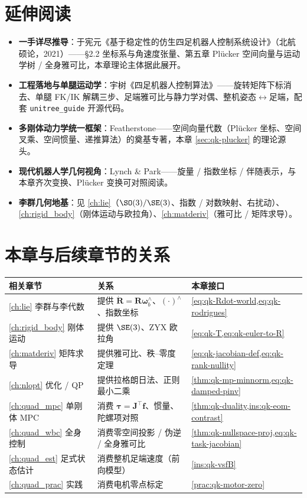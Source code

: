 \section*{延伸阅读}
\begin{itemize}
  \item \textbf{一手详尽推导}：于宪元《基于稳定性的仿生四足机器人控制系统设计》\cite{yu2021quadruped}（北航硕论，2021）——§2.2 坐标系与角速度张量、第五章 Plücker 空间向量与运动学树 / 全身雅可比，本章理论主体据此展开。
  \item \textbf{工程落地与单腿运动学}：宇树《四足机器人控制算法》\cite{unitree2023quadruped}——旋转矩阵下标消去、单腿 FK/IK 解耦三步、足端雅可比与静力学对偶、整机姿态$\leftrightarrow$足端，配套 \texttt{unitree\_guide} 开源代码。
  \item \textbf{多刚体动力学统一框架}：Featherstone\cite{featherstone2008rigid}——空间向量代数（Plücker 坐标、空间叉乘、空间惯量、递推算法）的奠基专著，本章 \cref{sec:qk-plucker} 的理论源头。
  \item \textbf{现代机器人学几何视角}：Lynch \& Park\cite{lynch2017modern}——旋量 / 指数坐标 / 伴随表示，与本章齐次变换、Plücker 变换可对照阅读。
  \item \textbf{李群几何地基}：见 \cref{ch:lie}（$\SO(3)/\SE(3)$、指数 / 对数映射、右扰动）、\cref{ch:rigid_body}（刚体运动与欧拉角）、\cref{ch:matderiv}（雅可比 / 矩阵求导）。
\end{itemize}

\section*{本章与后续章节的关系}
\begin{table}[H]\centering\small
\begin{tabular}{lll}
\toprule
相关章节 & 关系 & 本章接口 \\
\midrule
\cref{ch:lie} 李群与李代数 & 提供 $\dot{\mathbf{R}}=\mathbf{R}\boldsymbol{\omega}_b^\wedge$、$(\cdot)^\wedge$、指数坐标 & \cref{eq:qk-Rdot-world,eq:qk-rodrigues} \\
\cref{ch:rigid_body} 刚体运动 & 提供 $\SE(3)$、ZYX 欧拉角 & \cref{eq:qk-T,eq:qk-euler-to-R} \\
\cref{ch:matderiv} 矩阵求导 & 提供雅可比、秩--零度定理 & \cref{eq:qk-jacobian-def,eq:qk-rank-nullity} \\
\cref{ch:nlopt} 优化 / QP & 提供拉格朗日法、正则最小二乘 & \cref{thm:qk-mp-minnorm,eq:qk-damped-pinv} \\
\cref{ch:quad_mpc} 单刚体 MPC & 消费 $\boldsymbol{\tau}=\mathbf{J}^\top\mathbf{f}$、惯量、陀螺项对照 & \cref{thm:qk-duality,ins:qk-eom-contrast} \\
\cref{ch:quad_wbc} 全身控制 & 消费零空间投影 / 伪逆 / 全身雅可比 & \cref{thm:qk-nullspace-proj,eq:qk-task-jacobian} \\
\cref{ch:quad_est} 足式状态估计 & 消费整机足端速度（前向模型） & \cref{ins:qk-vsfB} \\
\cref{ch:quad_prac} 实践 & 消费电机零点标定 & \cref{prac:qk-motor-zero} \\
\bottomrule
\end{tabular}
\end{table}

